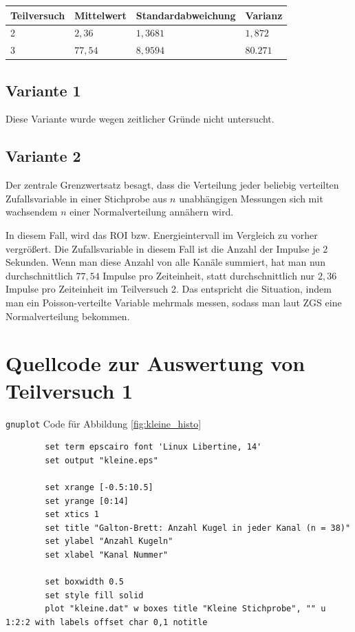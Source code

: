 \documentclass[twoside]{article}
\begin{document}
    \begin{center}
            \begin{tabular}{l | l l l}
                \toprule
                Teilversuch & Mittelwert & Standardabweichung & Varianz \\
                \midrule
                2 & $2,36$ & $1,3681$ & $1,872$ \\
                3 & $77,54$ & $8,9594$ & $80.271$ \\
                \bottomrule
            \end{tabular}
        \end{center}

    \subsection*{Variante 1}
        Diese Variante wurde wegen zeitlicher Gründe nicht untersucht.
    \subsection*{Variante 2}
        Der zentrale Grenzwertsatz besagt, dass die Verteilung jeder beliebig verteilten Zufallsvariable in einer Stichprobe aus $n$ unabhängigen Messungen sich mit wachsendem $n$ einer Normalverteilung annähern wird. 
        
        In diesem Fall, wird das ROI bzw. Energieintervall im Vergleich zu vorher vergrößert. Die Zufallsvariable in diesem Fall ist die Anzahl der Impulse je 2 Sekunden. Wenn man diese Anzahl von alle Kanäle summiert, hat man nun durchschnittlich $77,54$ Impulse pro Zeiteinheit, statt durchschnittlich nur $2,36$ Impulse pro Zeiteinheit im Teilversuch 2. Das entspricht die Situation, indem man ein Poisson-verteilte Variable mehrmals messen, sodass man laut ZGS eine Normalverteilung bekommen. 
        
\appendix
\newpage
\section{Quellcode zur Auswertung von Teilversuch 1}
    \label{appdx:codes}
    
    \texttt{gnuplot} Code für Abbildung \ref{fig:kleine_histo}
    \begin{verbatim}
        set term epscairo font 'Linux Libertine, 14'
        set output "kleine.eps"
        
        set xrange [-0.5:10.5]
        set yrange [0:14]
        set xtics 1
        set title "Galton-Brett: Anzahl Kugel in jeder Kanal (n = 38)"
        set ylabel "Anzahl Kugeln"
        set xlabel "Kanal Nummer"
        
        set boxwidth 0.5
        set style fill solid
        plot "kleine.dat" w boxes title "Kleine Stichprobe", "" u 1:2:2 with labels offset char 0,1 notitle
    \end{verbatim}
    
\end{document}
